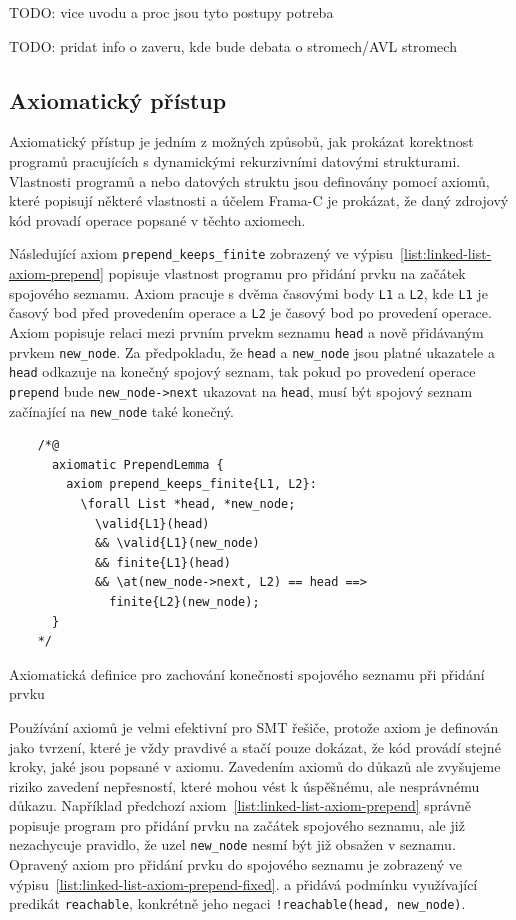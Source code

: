 TODO: vice uvodu a proc jsou tyto postupy potreba

TODO: pridat info o zaveru, kde bude debata o stromech/AVL stromech

\subsection{Axiomatický přístup}
\label{subsec:axiomaticky-pristup}

Axiomatický přístup je jedním z možných způsobů,
jak prokázat korektnost programů pracujících s dynamickými rekurzivními datovými strukturami.
Vlastnosti programů a nebo datových struktu jsou definovány pomocí axiomů,
které popisují některé vlastnosti a účelem Frama\mbox{-}C je prokázat,
že daný zdrojový kód provadí operace popsané v těchto axiomech.

Následující axiom \texttt{prepend\_keeps\_finite} zobrazený ve výpisu~\ref{list:linked-list-axiom-prepend}
popisuje vlastnost programu pro přidání prvku na začátek spojového seznamu.
Axiom pracuje s dvěma časovými body \texttt{L1} a \texttt{L2},
kde \texttt{L1} je časový bod před provedením operace
a \texttt{L2} je časový bod po provedení operace.
Axiom popisuje relaci mezi prvním prvekm seznamu \texttt{head} a nově přidávaným prvkem \texttt{new\_node}.
Za předpokladu, že \texttt{head} a \texttt{new\_node} jsou platné ukazatele
a \texttt{head} odkazuje na konečný spojový seznam,
tak pokud po provedení operace \texttt{prepend} bude \texttt{new\_node->next} ukazovat na \texttt{head},
musí být spojový seznam začínající na \texttt{new\_node} také konečný.

\begin{listing}[H]
    \begin{verbatim}
    /*@
      axiomatic PrependLemma {
        axiom prepend_keeps_finite{L1, L2}:
          \forall List *head, *new_node;
            \valid{L1}(head)
            && \valid{L1}(new_node)
            && finite{L1}(head)
            && \at(new_node->next, L2) == head ==>
              finite{L2}(new_node);
      }
    */
    \end{verbatim}
    \caption{Axiomatická definice pro zachování konečnosti spojového seznamu při přidání prvku}
    \label{list:linked-list-axiom-prepend}
\end{listing}

Používání axiomů je velmi efektivní pro SMT řešiče,
protože axiom je definován jako tvrzení, které je vždy pravdivé a stačí pouze dokázat,
že kód provádí stejné kroky, jaké jsou popsané v axiomu.
Zavedením axiomů do důkazů ale zvyšujeme riziko zavedení nepřesností,
které mohou vést k úspěšnému, ale nesprávnému důkazu.
Například předchozí axiom~\ref{list:linked-list-axiom-prepend} správně popisuje
program pro přidání prvku na začátek spojového seznamu,
ale již nezachycuje pravidlo, že uzel \texttt{new\_node} nesmí být již obsažen v seznamu.
Opravený axiom pro přidání prvku do spojového seznamu
je zobrazený ve výpisu~\ref{list:linked-list-axiom-prepend-fixed}.
a přidává podmínku využívající predikát \texttt{reachable},
konkrétně jeho negaci \texttt{!reachable(head, new\_node)}.

